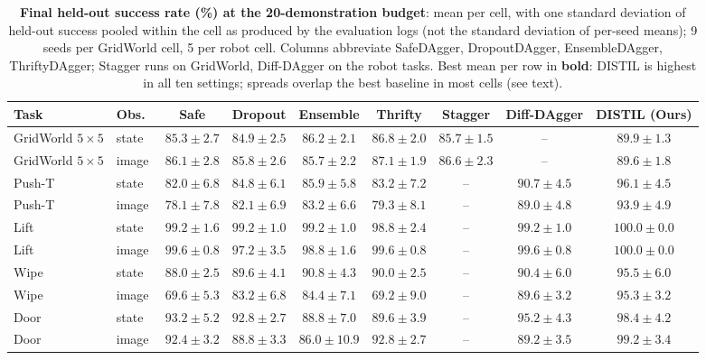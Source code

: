 \documentclass[letterpaper]{article} %
\begin{document}
\begin{table}[t]
\centering
\small
\setlength{\tabcolsep}{4pt}
\caption{\textbf{Final held-out success rate (\%) at the 20-demonstration
budget}: mean per cell, with one standard deviation of held-out success
pooled within the cell as produced by the evaluation logs (not the standard
deviation of per-seed means); 9 seeds per GridWorld cell, 5 per robot cell.
Columns abbreviate SafeDAgger, DropoutDAgger, EnsembleDAgger,
ThriftyDAgger; Stagger runs on GridWorld, Diff-DAgger on the robot tasks.
Best mean per row in \textbf{bold}: DISTIL is highest in all ten settings;
spreads overlap the best baseline in most cells (see text).}
\label{tab:main}
\begin{tabular}{llccccccc}
\toprule
Task & Obs.\ & Safe & Dropout & Ensemble & Thrifty & Stagger & Diff-DAgger & DISTIL (Ours) \\
\midrule
GridWorld $5{\times}5$ & state & $85.3 \pm 2.7$ & $84.9 \pm 2.5$ & $86.2 \pm 2.1$ & $86.8 \pm 2.0$ & $85.7 \pm 1.5$ & -- &$\mathbf{89.9 \pm 1.3}$ \\
GridWorld $5{\times}5$ & image & $86.1 \pm 2.8$ & $85.8 \pm 2.6$ & $85.7 \pm 2.2$ & $87.1 \pm 1.9$ & $86.6 \pm 2.3$ & -- &$\mathbf{89.6 \pm 1.8}$ \\
\addlinespace
Push-T & state & $82.0 \pm 6.8$ & $84.8 \pm 6.1$ & $85.9 \pm 5.8$ & $83.2 \pm 7.2$ & -- &$90.7 \pm 4.5$ & $\mathbf{96.1 \pm 4.5}$ \\
Push-T & image & $78.1 \pm 7.8$ & $82.1 \pm 6.9$ & $83.2 \pm 6.6$ & $79.3 \pm 8.1$ & -- &$89.0 \pm 4.8$ & $\mathbf{93.9 \pm 4.9}$ \\
\addlinespace
Lift & state & $99.2 \pm 1.6$ & $99.2 \pm 1.0$ & $99.2 \pm 1.0$ & $98.8 \pm 2.4$ & -- &$99.2 \pm 1.0$ & $\mathbf{100.0 \pm 0.0}$ \\
Lift & image & $99.6 \pm 0.8$ & $97.2 \pm 3.5$ & $98.8 \pm 1.6$ & $99.6 \pm 0.8$ & -- &$99.6 \pm 0.8$ & $\mathbf{100.0 \pm 0.0}$ \\
\addlinespace
Wipe & state & $88.0 \pm 2.5$ & $89.6 \pm 4.1$ & $90.8 \pm 4.3$ & $90.0 \pm 2.5$ & -- &$90.4 \pm 6.0$ & $\mathbf{95.5 \pm 6.0}$ \\
Wipe & image & $69.6 \pm 5.3$ & $83.2 \pm 6.8$ & $84.4 \pm 7.1$ & $69.2 \pm 9.0$ & -- &$89.6 \pm 3.2$ & $\mathbf{95.3 \pm 3.2}$ \\
\addlinespace
Door & state & $93.2 \pm 5.2$ & $92.8 \pm 2.7$ & $88.8 \pm 7.0$ & $89.6 \pm 3.9$ & -- &$95.2 \pm 4.3$ & $\mathbf{98.4 \pm 4.2}$ \\
Door & image & $92.4 \pm 3.2$ & $88.8 \pm 3.3$ & $86.0 \pm 10.9$ & $92.8 \pm 2.7$ & -- &$89.2 \pm 3.5$ & $\mathbf{99.2 \pm 3.4}$ \\
\bottomrule
\end{tabular}
\end{table}
\end{document}
